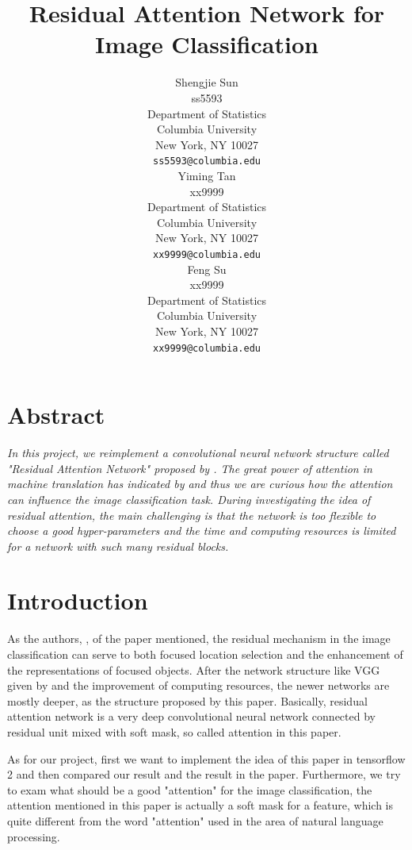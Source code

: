 \documentclass{article}
\title{Residual Attention Network for Image Classification}
\author{%
  Shengjie Sun \\
  ss5593\\
  Department of Statistics\\
  Columbia University\\
  New York, NY 10027 \\
  \texttt{ss5593@columbia.edu} \\
  \And
  Yiming Tan \\
  xx9999 \\
  Department of Statistics\\
  Columbia University\\
  New York, NY 10027 \\
  \texttt{xx9999@columbia.edu} \\
  \And
  Feng Su \\
  xx9999 \\
  Department of Statistics\\
  Columbia University\\
  New York, NY 10027 \\
  \texttt{xx9999@columbia.edu}
}
\begin{document}
\maketitle

\begin{multicols}{2}
\section*{Abstract}
\textit{In this project, we reimplement a convolutional neural network structure called "Residual Attention Network" proposed by \citet{wang2017residual}. The great power of attention in machine translation has indicated by \citet{vaswani2017attention} and thus we are curious how the attention can influence the image classification task. During investigating the idea of residual attention, the main challenging is that the network is too flexible to choose a good hyper-parameters and the time and computing resources is limited for a network with such many residual blocks.}




\section{Introduction}
As the authors, \citet{vaswani2017attention}, of the paper mentioned, the residual mechanism in the image classification can serve to both focused location selection and the enhancement of the representations of focused objects. After the network structure like VGG given by \cite{simonyan2014very} and the improvement of computing resources, the newer networks are mostly deeper, as the structure proposed by this paper. Basically, residual attention network is a very deep convolutional neural network connected by residual unit mixed with soft mask, so called attention in this paper. 

As for our project, first we want to implement the idea of this paper in tensorflow 2 and then compared our result and the result in the paper. Furthermore, we try to exam what should be a good "attention" for the image classification, the attention mentioned in this paper is actually a soft mask for a feature, which is quite different from the word "attention" used in the area of natural language processing. 
\end{multicols}
\end{document}
